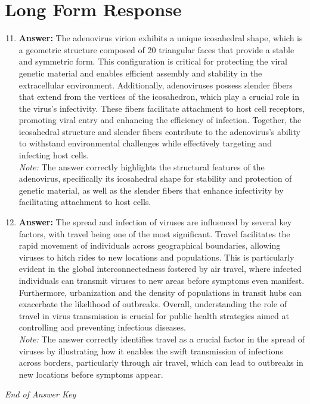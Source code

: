 \documentclass[12pt]{article}
\begin{document}
\section*{Long Form Response}
\begin{enumerate}[label=\arabic*.]
\setcounter{enumi}{10}
\item \textbf{Answer:} The adenovirus virion exhibits a unique icosahedral shape, which is a geometric structure composed of 20 triangular faces that provide a stable and symmetric form. This configuration is critical for protecting the viral genetic material and enables efficient assembly and stability in the extracellular environment. Additionally, adenoviruses possess slender fibers that extend from the vertices of the icosahedron, which play a crucial role in the virus's infectivity. These fibers facilitate attachment to host cell receptors, promoting viral entry and enhancing the efficiency of infection. Together, the icosahedral structure and slender fibers contribute to the adenovirus's ability to withstand environmental challenges while effectively targeting and infecting host cells.
\\ \textit{Note:} The answer correctly highlights the structural features of the adenovirus, specifically its icosahedral shape for stability and protection of genetic material, as well as the slender fibers that enhance infectivity by facilitating attachment to host cells.
\item \textbf{Answer:} The spread and infection of viruses are influenced by several key factors, with travel being one of the most significant. Travel facilitates the rapid movement of individuals across geographical boundaries, allowing viruses to hitch rides to new locations and populations. This is particularly evident in the global interconnectedness fostered by air travel, where infected individuals can transmit viruses to new areas before symptoms even manifest. Furthermore, urbanization and the density of populations in transit hubs can exacerbate the likelihood of outbreaks. Overall, understanding the role of travel in virus transmission is crucial for public health strategies aimed at controlling and preventing infectious diseases.
\\ \textit{Note:} The answer correctly identifies travel as a crucial factor in the spread of viruses by illustrating how it enables the swift transmission of infections across borders, particularly through air travel, which can lead to outbreaks in new locations before symptoms appear.
\end{enumerate}

\vfill
\noindent\textit{End of Answer Key}
\end{document}

